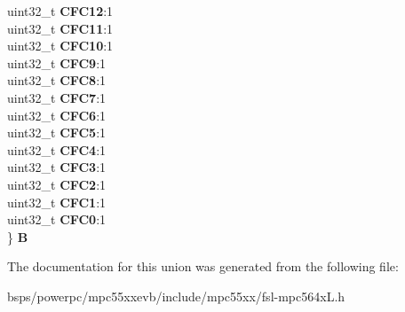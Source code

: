 \begin{DoxyCompactItemize}
\begin{tabbing}
\>uint32\_t {\bfseries CFC12}:1\\
\>uint32\_t {\bfseries CFC11}:1\\
\>uint32\_t {\bfseries CFC10}:1\\
\>uint32\_t {\bfseries CFC9}:1\\
\>uint32\_t {\bfseries CFC8}:1\\
\>uint32\_t {\bfseries CFC7}:1\\
\>uint32\_t {\bfseries CFC6}:1\\
\>uint32\_t {\bfseries CFC5}:1\\
\>uint32\_t {\bfseries CFC4}:1\\
\>uint32\_t {\bfseries CFC3}:1\\
\>uint32\_t {\bfseries CFC2}:1\\
\>uint32\_t {\bfseries CFC1}:1\\
\>uint32\_t {\bfseries CFC0}:1\\
\} {\bfseries B}\\

\end{tabbing}\end{DoxyCompactItemize}


The documentation for this union was generated from the following file\+:\begin{DoxyCompactItemize}
\item 
bsps/powerpc/mpc55xxevb/include/mpc55xx/fsl-\/mpc564x\+L.\+h\end{DoxyCompactItemize}
